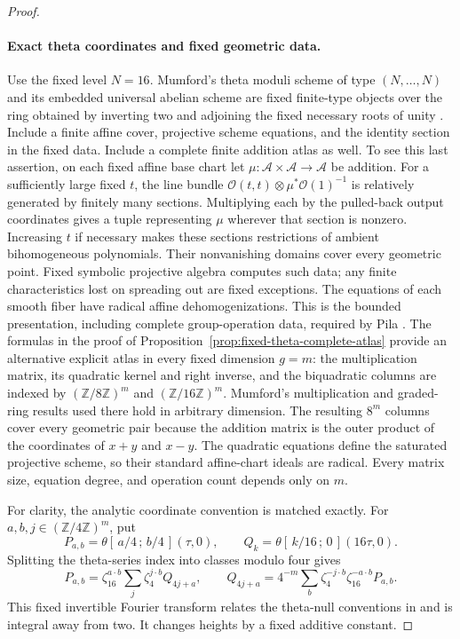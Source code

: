 \documentclass[11pt]{article}
\theoremstyle{definition}
\theoremstyle{remark}
\begin{document}
\begin{proof}
\paragraph{Exact theta coordinates and fixed geometric data.}
Use the fixed level $N=16$.  Mumford's theta moduli scheme of type
$(N,\ldots,N)$ and its embedded universal abelian scheme are fixed
finite-type objects over the ring obtained by inverting two and adjoining
the fixed necessary roots of unity
\cite[Section 6, pp.~76--84]{Mumford1967}.  Include a finite affine cover,
projective scheme equations, and the identity section in the fixed data.
Include a complete finite addition atlas as well.  To see this last
assertion, on each fixed affine base chart let
$\mu:\mathcal A\times\mathcal A\to\mathcal A$ be addition.
For a sufficiently large fixed $t$, the line bundle
$\mathcal O(t,t)\otimes\mu^*\mathcal O(1)^{-1}$ is relatively generated by
finitely many sections.  Multiplying each by the pulled-back output
coordinates gives a tuple representing $\mu$ wherever that section is
nonzero.  Increasing $t$ if necessary makes these sections restrictions of
ambient bihomogeneous polynomials.  Their nonvanishing domains cover every
geometric point.  Fixed symbolic projective algebra computes such data;
any finite characteristics lost on spreading out are fixed exceptions.
The equations of each smooth fiber have radical affine dehomogenizations.
This is the bounded presentation, including complete group-operation data,
required by Pila \cite[Section 3, pp.~752--753]{Pila1990}.
The formulas in the proof of
Proposition~\ref{prop:fixed-theta-complete-atlas} provide an alternative
explicit atlas in every fixed dimension $g=m$: the multiplication matrix,
its quadratic kernel and right inverse, and the biquadratic columns are
indexed by $(\mathbb Z/8\mathbb Z)^m$ and $(\mathbb Z/16\mathbb Z)^m$.
Mumford's multiplication and graded-ring results used there hold in arbitrary
dimension.  The resulting $8^m$ columns cover every geometric pair because
the addition matrix is the outer product of the coordinates of $x+y$ and
$x-y$.  The quadratic equations define the saturated projective scheme,
so their standard affine-chart ideals are radical.  Every matrix size,
equation degree, and operation count depends only on $m$.

For clarity, the analytic coordinate convention is matched exactly.
For $a,b,j\in(\mathbb Z/4\mathbb Z)^m$, put
\[
 P_{a,b}=\theta[\,a/4\,;\,b/4\,](\tau,0),\qquad
 Q_k=\theta[\,k/16\,;\,0\,](16\tau,0).
\]
Splitting the theta-series index into classes modulo four gives
\[
 P_{a,b}=\zeta_{16}^{a\cdot b}
 \sum_j\zeta_4^{j\cdot b}Q_{4j+a},\qquad
 Q_{4j+a}=4^{-m}\sum_b
 \zeta_4^{-j\cdot b}\zeta_{16}^{-a\cdot b}P_{a,b}.
\]
This fixed invertible Fourier transform relates the theta-null conventions
in \cite[Section 2.3.4, p.~30]{Pazuki2012} and is integral away from two.
It changes heights by a fixed additive constant.


\end{proof}
\end{document}
